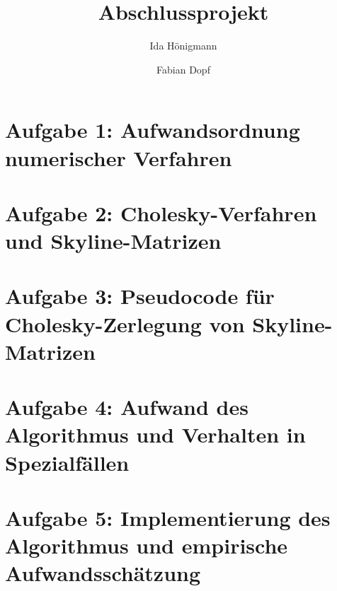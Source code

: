 \documentclass[]{article}
\title{Abschlussprojekt}
\author{Ida Hönigmann \and Fabian Dopf}
\begin{document}
\maketitle

\section*{Aufgabe 1: Aufwandsordnung numerischer Verfahren}


\section*{Aufgabe 2: Cholesky-Verfahren und Skyline-Matrizen}

\section*{Aufgabe 3: Pseudocode für Cholesky-Zerlegung von Skyline-Matrizen}

\section*{Aufgabe 4: Aufwand des Algorithmus und Verhalten in Spezialfällen}

\section*{Aufgabe 5: Implementierung des Algorithmus und empirische Aufwandsschätzung}
\end{document}
